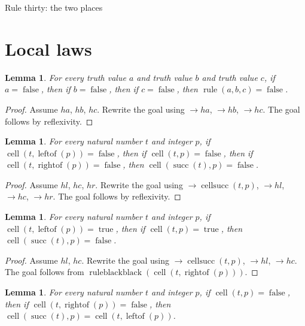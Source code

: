 \documentclass[11pt]{article}
\newtheorem{lemma}[theorem]{Lemma}
\theoremstyle{definition}
\begin{document}
\begin{center}
{\LARGE Rule thirty: the two places}
\end{center}
\section{Local laws}
\label{ll:paper:local-laws}
\begin{lemma}
\label{ll:paper:white-interior}
For every truth value \(a\) and truth value \(b\) and truth value \(c\), if \(a = \operatorname{false}\), then if \(b = \operatorname{false}\), then if \(c = \operatorname{false}\), then \(\operatorname{rule}(a, b, c) = \operatorname{false}\).
\end{lemma}
\begin{proof}
Assume \(ha\), \(hb\), \(hc\).
Rewrite the goal using \(\rightarrow ha\), \(\rightarrow hb\), \(\rightarrow hc\).
The goal follows by reflexivity.
\end{proof}
\begin{lemma}
\label{ll:paper:white-run-interior}
For every natural number \(t\) and integer \(p\), if \(\operatorname{cell}(t, \operatorname{leftof}(p)) = \operatorname{false}\), then if \(\operatorname{cell}(t, p) = \operatorname{false}\), then if \(\operatorname{cell}(t, \operatorname{rightof}(p)) = \operatorname{false}\), then \(\operatorname{cell}(\operatorname{succ}(t), p) = \operatorname{false}\).
\end{lemma}
\begin{proof}
Assume \(hl\), \(hc\), \(hr\).
Rewrite the goal using \(\rightarrow \operatorname{cellsucc}(t, p)\), \(\rightarrow hl\), \(\rightarrow hc\), \(\rightarrow hr\).
The goal follows by reflexivity.
\end{proof}
\begin{lemma}
\label{ll:paper:black-run-interior}
For every natural number \(t\) and integer \(p\), if \(\operatorname{cell}(t, \operatorname{leftof}(p)) = \operatorname{true}\), then if \(\operatorname{cell}(t, p) = \operatorname{true}\), then \(\operatorname{cell}(\operatorname{succ}(t), p) = \operatorname{false}\).
\end{lemma}
\begin{proof}
Assume \(hl\), \(hc\).
Rewrite the goal using \(\rightarrow \operatorname{cellsucc}(t, p)\), \(\rightarrow hl\), \(\rightarrow hc\).
The goal follows from \(\operatorname{ruleblackblack}(\operatorname{cell}(t, \operatorname{rightof}(p)))\).
\end{proof}
\begin{lemma}
\label{ll:paper:white-pair-right}
For every natural number \(t\) and integer \(p\), if \(\operatorname{cell}(t, p) = \operatorname{false}\), then if \(\operatorname{cell}(t, \operatorname{rightof}(p)) = \operatorname{false}\), then \(\operatorname{cell}(\operatorname{succ}(t), p) = \operatorname{cell}(t, \operatorname{leftof}(p))\).
\end{lemma}
\end{document}
